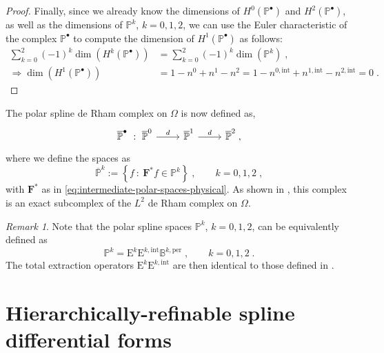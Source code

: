 \documentclass[10pt]{article}
\newcommand{\mbf}[1]{{\boldsymbol{#1}}}
\newcommand{\vSpace}[1]{\mathbb{#1}}
\newcommand{\complex}[1]{\mathit{\vSpace{#1}^\bullet}}
\newcommand{\mat}[1]{\mbf{\mathrm{#1}}}
\newcommand{\cU}{\theta}
\newcommand{\cV}{\rho}
\newcommand{\kntU}{\cU}
\newcommand{\kntV}{\cV}
\newcommand{\kntsU}{\mbf{\kntU}}
\newcommand{\kntsV}{\mbf{\kntV}}
\newcommand{\pkntsU}{\kntsU^\per}
\newcommand{\bsp}{B}
\newcommand{\bspS}{\vSpace{\bsp}}
\newcommand{\tpF}[2]{\bspS^{#1}}
\newcommand{\per}{\mathrm{per}}
\newcommand{\polar}{P}
\newcommand{\polarS}{\vSpace{\polar}}
\newcommand{\polarF}[1]{\polarS^{#1}}
\newcommand{\tint}{\mathrm{int}}
\newcommand{\polarDomain}{\Omega}
\theoremstyle{plain}
\theoremstyle{definition}
\theoremstyle{remark}
\newtheorem{remark}{Remark}[section]
\begin{document}
\begin{proof}
    Finally, since we already know the dimensions of $H^0(\complex{\polar})$ and $H^2(\complex{\polar})$, as well as the dimensions of $\polarF{k}$, $k = 0, 1, 2$, we can use the Euler characteristic of the complex $\complex{\polar}$ to compute the dimension of $H^1(\complex{\polar})$ as follows:
    \begin{equation*}
        \begin{split}
            \sum_{k=0}^2 (-1)^k \dim(H^k(\complex{\polar})) &= \sum_{k=0}^2 (-1)^k \dim(\polarF{k})\;,\\
            \Longrightarrow \dim(H^1(\complex{\polar})) &= 1 - n^0 + n^1 - n^2 = 1 - n^{0,\tint} + n^{1,\tint} - n^{2,\tint} = 0\;.
        \end{split}
    \end{equation*}
\end{proof}

The polar spline de Rham complex on $\polarDomain$ is now defined as,
\begin{equation}
    \begin{tikzcd}
        \complex{\overline{\polar}}~:~ \overline{\polarS}^{0} \arrow{r}{d} & \overline{\polarS}^{1} \arrow{r}{d} & \overline{\polarS}^{2}\;,
    \end{tikzcd}
\end{equation}
where we define the spaces as
\begin{equation}
    \overline{\polarS}^{k} := \left\{ f ~:~ \mbf{F}^* f  \in \polarS^{k} \right\}\;,\qquad k = 0, 1, 2\;,
\end{equation}
with $\mbf{F}^*$ as in \cref{eq:intermediate-polar-spaces-physical}.
As shown in \cite{Toshniwal:2021}, this complex is an exact subcomplex of the $L^2$ de Rham complex on $\polarDomain$.

\begin{remark}
    Note that the polar spline spaces $\polarF{k}$, $k = 0, 1, 2$, can be equivalently defined as
    \begin{equation}
        \polarF{k} = \mat{E}^k\mat{E}^{k,\tint}\tpF{k,\per}{\pkntsU,\kntsV}\;,\qquad k = 0, 1, 2\;.
    \end{equation}
    The total extraction operators $\mat{E}^k\mat{E}^{k,\tint}$ are then identical to those defined in \cite{Toshniwal:2021}.
\end{remark}

\section{Hierarchically-refinable spline differential forms}
\label{sec:construction}
\end{document}
